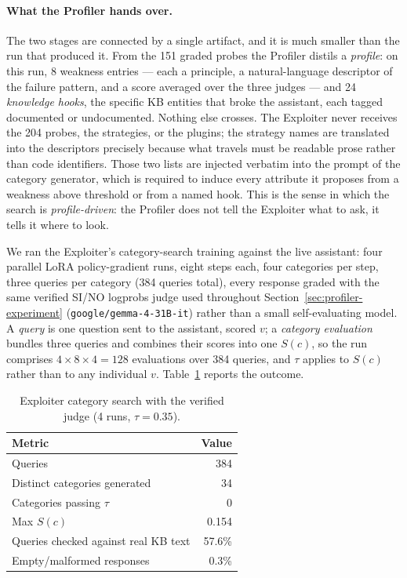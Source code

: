 \documentclass[11pt,a4paper]{article}
\begin{document}
\paragraph{What the Profiler hands over.} The two stages are connected by a single
artifact, and it is much smaller than the run that produced it. From the 151 graded
probes the Profiler distils a \emph{profile}: on this run, 8 weakness entries --- each a
principle, a natural-language descriptor of the failure pattern, and a score averaged over
the three judges --- and 24 \emph{knowledge hooks}, the specific KB entities that broke the
assistant, each tagged documented or undocumented. Nothing else crosses. The Exploiter
never receives the 204 probes, the strategies, or the plugins; the strategy names are
translated into the descriptors precisely because what travels must be readable prose
rather than code identifiers. Those two lists are injected verbatim into the prompt of the
category generator, which is required to induce every attribute it proposes from a weakness
above threshold or from a named hook. This is the sense in which the search is
\emph{profile-driven}: the Profiler does not tell the Exploiter what to ask, it tells it
where to look.

We ran the Exploiter's category-search training against the live assistant:
four parallel LoRA policy-gradient runs, eight steps each, four categories
per step, three queries per category (384 queries total), every response
graded with the same verified SI/NO logprobs judge used throughout
Section~\ref{sec:profiler-experiment} (\texttt{google/gemma-4-31B-it}) rather
than a small self-evaluating model. A \emph{query} is one question sent to the assistant,
scored $v$; a \emph{category evaluation} bundles three queries and combines their scores
into one $S(c)$, so the run comprises $4 \times 8 \times 4 = 128$ evaluations over 384
queries, and $\tau$ applies to $S(c)$ rather than to any individual $v$.
Table~\ref{tab:exploiter-judge} reports the outcome.

\begin{table}[ht]
\centering
\small
\caption{Exploiter category search with the verified judge (4 runs, $\tau=0.35$).}
\label{tab:exploiter-judge}
\begin{tabular}{lr}
\toprule
Metric & Value \\
\midrule
Queries & 384 \\
Distinct categories generated & 34 \\
Categories passing $\tau$ & 0 \\
Max $S(c)$ & 0.154 \\
Queries checked against real KB text & 57.6\% \\
Empty/malformed responses & 0.3\% \\
\bottomrule
\end{tabular}
\end{table}
\end{document}
